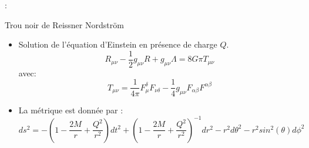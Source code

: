 %
%	
%
%
%	
%
%
%


\begin{frame}{\underline{\secname} : {\small \subsecname}}

\begin{block}{Trou noir de Reissner Nordström}
	
	
	\begin{itemize}
		\item Solution de l'équation d'Einstein en présence de charge $Q$.
		$$R_{\mu\nu}-\dfrac{1}{2}g_{\mu\nu}R+g_{\mu\nu}\Lambda=8G\pi T_{\mu\nu}$$
		avec:
		$$T_{\mu\nu}=\dfrac{1}{4\pi}F_{\mu}^{\delta}F_{\nu\delta}-\dfrac{1}{4}g_{\mu\nu}F_{\alpha\beta}F^{\alpha\beta}$$
		\item La métrique est donnée par :
		$$ds^{2}=-(1-\dfrac{2M}{r}+\dfrac{Q^{2}}{r^{2}})dt^{2}+(1-\dfrac{2M}{r}+\dfrac{Q^{2}}{r^{2}})^{-1}dr^{2}-r^{2}d\theta^{2}-r^{2}sin^{2}(\theta)d\phi^{2}$$ 
	\end{itemize}
	
\end{block}
\end{frame}


